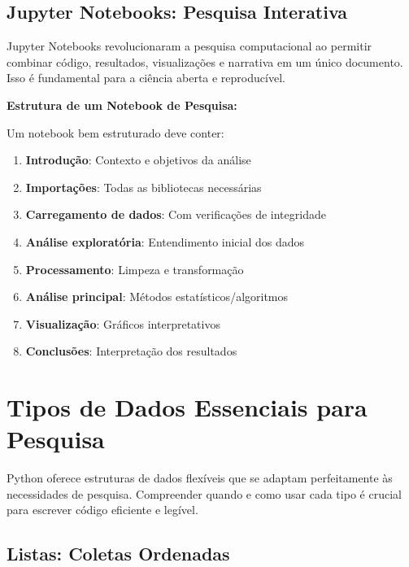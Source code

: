 \subsection{Jupyter Notebooks: Pesquisa Interativa}

Jupyter Notebooks revolucionaram a pesquisa computacional ao permitir combinar código, resultados, visualizações e narrativa em um único documento. Isso é fundamental para a ciência aberta e reproducível.

\begin{researchbox}
\textbf{Estrutura de um Notebook de Pesquisa:}

Um notebook bem estruturado deve conter:
\begin{enumerate}
    \item \textbf{Introdução}: Contexto e objetivos da análise
    \item \textbf{Importações}: Todas as bibliotecas necessárias
    \item \textbf{Carregamento de dados}: Com verificações de integridade
    \item \textbf{Análise exploratória}: Entendimento inicial dos dados
    \item \textbf{Processamento}: Limpeza e transformação
    \item \textbf{Análise principal}: Métodos estatísticos/algoritmos
    \item \textbf{Visualização}: Gráficos interpretativos
    \item \textbf{Conclusões}: Interpretação dos resultados
\end{enumerate}
\end{researchbox}

\section{Tipos de Dados Essenciais para Pesquisa}

Python oferece estruturas de dados flexíveis que se adaptam perfeitamente às necessidades de pesquisa. Compreender quando e como usar cada tipo é crucial para escrever código eficiente e legível.

\subsection{Listas: Coletas Ordenadas}

